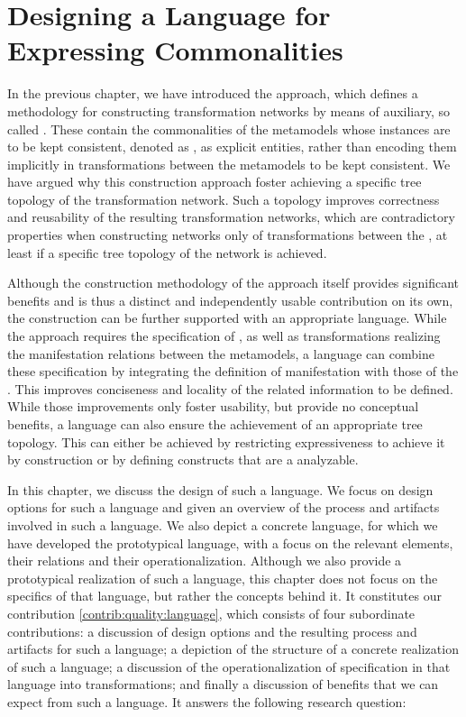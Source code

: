 \chapter{Designing a Language for Expressing Commonalities 
}
\label{chap:language}

In the previous chapter, we have introduced the \commonalities approach, which defines a methodology for constructing transformation networks by means of auxiliary, so called \conceptmetamodels.
These \conceptmetamodels contain the commonalities of the metamodels whose instances are to be kept consistent, denoted as \concretemetamodels, as explicit entities, rather than encoding them implicitly in transformations between the metamodels to be kept consistent.
We have argued why this construction approach foster achieving a specific tree topology of the transformation network.
Such a topology improves correctness and reusability of the resulting transformation networks, which are contradictory properties when constructing networks only of transformations between the \concretemetamodels, at least if a specific tree topology of the network is achieved.

Although the construction methodology of the \commonalities approach itself provides significant benefits and is thus a distinct and independently usable contribution on its own, the construction can be further supported with an appropriate language.
While the approach requires the specification of \conceptmetamodels, as well as transformations realizing the manifestation relations between the metamodels, a language can combine these specification by integrating the definition of manifestation with those of the \commonalities.
This improves conciseness and locality of the related information to be defined.
While those improvements only foster usability, but provide no conceptual benefits, a language can also ensure the achievement of an appropriate tree topology.
This can either be achieved by restricting expressiveness to achieve it by construction or by defining constructs that are a analyzable.

In this chapter, we discuss the design of such a language.
We focus on design options for such a language and given an overview of the process and artifacts involved in such a language.
We also depict a concrete language, for which we have developed the prototypical \commonalities language, with a focus on the relevant elements, their relations and their operationalization.
Although we also provide a prototypical realization of such a language, this chapter does not focus on the specifics of that language, but rather the concepts behind it.
It constitutes our contribution \autoref{contrib:quality:language}, which consists of four subordinate contributions: a discussion of design options and the resulting process and artifacts for such a language; a depiction of the structure of a concrete realization of such a language; a discussion of the operationalization of specification in that language into transformations; and finally a discussion of benefits that we can expect from such a language.
It answers the following research question:

